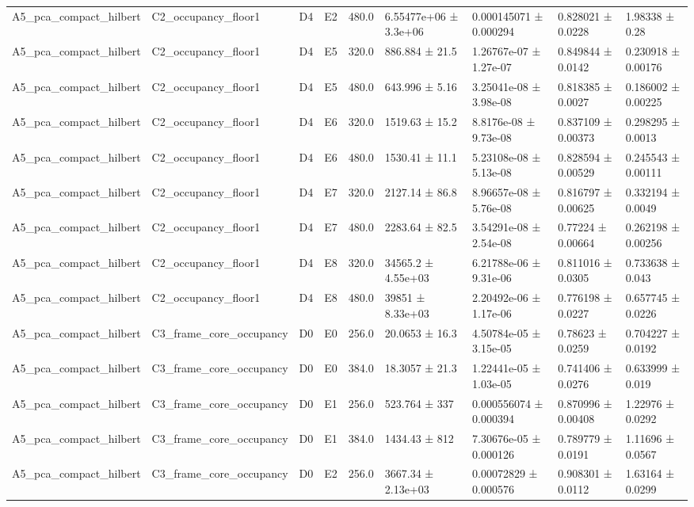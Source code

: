 \begin{table}
\begin{tabular}{lllllllll}
A5\_pca\_compact\_hilbert & C2\_occupancy\_floor1 & D4 & E2 & 480.0 & 6.55477e+06 ± 3.3e+06 & 0.000145071 ± 0.000294 & 0.828021 ± 0.0228 & 1.98338 ± 0.28 \\
A5\_pca\_compact\_hilbert & C2\_occupancy\_floor1 & D4 & E5 & 320.0 & 886.884 ± 21.5 & 1.26767e-07 ± 1.27e-07 & 0.849844 ± 0.0142 & 0.230918 ± 0.00176 \\
A5\_pca\_compact\_hilbert & C2\_occupancy\_floor1 & D4 & E5 & 480.0 & 643.996 ± 5.16 & 3.25041e-08 ± 3.98e-08 & 0.818385 ± 0.0027 & 0.186002 ± 0.00225 \\
A5\_pca\_compact\_hilbert & C2\_occupancy\_floor1 & D4 & E6 & 320.0 & 1519.63 ± 15.2 & 8.8176e-08 ± 9.73e-08 & 0.837109 ± 0.00373 & 0.298295 ± 0.0013 \\
A5\_pca\_compact\_hilbert & C2\_occupancy\_floor1 & D4 & E6 & 480.0 & 1530.41 ± 11.1 & 5.23108e-08 ± 5.13e-08 & 0.828594 ± 0.00529 & 0.245543 ± 0.00111 \\
A5\_pca\_compact\_hilbert & C2\_occupancy\_floor1 & D4 & E7 & 320.0 & 2127.14 ± 86.8 & 8.96657e-08 ± 5.76e-08 & 0.816797 ± 0.00625 & 0.332194 ± 0.0049 \\
A5\_pca\_compact\_hilbert & C2\_occupancy\_floor1 & D4 & E7 & 480.0 & 2283.64 ± 82.5 & 3.54291e-08 ± 2.54e-08 & 0.77224 ± 0.00664 & 0.262198 ± 0.00256 \\
A5\_pca\_compact\_hilbert & C2\_occupancy\_floor1 & D4 & E8 & 320.0 & 34565.2 ± 4.55e+03 & 6.21788e-06 ± 9.31e-06 & 0.811016 ± 0.0305 & 0.733638 ± 0.043 \\
A5\_pca\_compact\_hilbert & C2\_occupancy\_floor1 & D4 & E8 & 480.0 & 39851 ± 8.33e+03 & 2.20492e-06 ± 1.17e-06 & 0.776198 ± 0.0227 & 0.657745 ± 0.0226 \\
A5\_pca\_compact\_hilbert & C3\_frame\_core\_occupancy & D0 & E0 & 256.0 & 20.0653 ± 16.3 & 4.50784e-05 ± 3.15e-05 & 0.78623 ± 0.0259 & 0.704227 ± 0.0192 \\
A5\_pca\_compact\_hilbert & C3\_frame\_core\_occupancy & D0 & E0 & 384.0 & 18.3057 ± 21.3 & 1.22441e-05 ± 1.03e-05 & 0.741406 ± 0.0276 & 0.633999 ± 0.019 \\
A5\_pca\_compact\_hilbert & C3\_frame\_core\_occupancy & D0 & E1 & 256.0 & 523.764 ± 337 & 0.000556074 ± 0.000394 & 0.870996 ± 0.00408 & 1.22976 ± 0.0292 \\
A5\_pca\_compact\_hilbert & C3\_frame\_core\_occupancy & D0 & E1 & 384.0 & 1434.43 ± 812 & 7.30676e-05 ± 0.000126 & 0.789779 ± 0.0191 & 1.11696 ± 0.0567 \\
A5\_pca\_compact\_hilbert & C3\_frame\_core\_occupancy & D0 & E2 & 256.0 & 3667.34 ± 2.13e+03 & 0.00072829 ± 0.000576 & 0.908301 ± 0.0112 & 1.63164 ± 0.0299 \\

\end{tabular}
\end{table}
